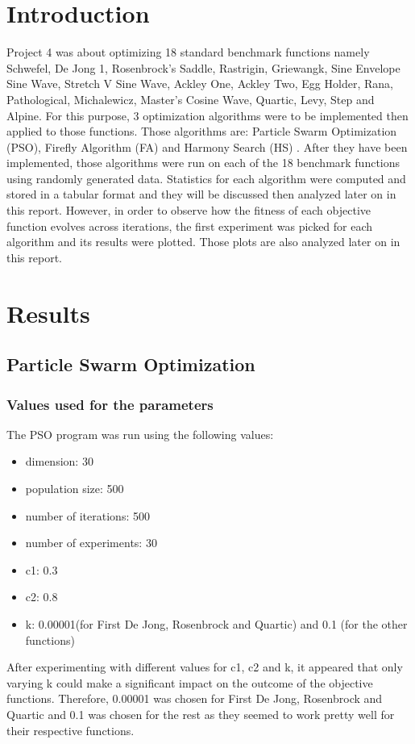\documentclass[12pt]{article}
\begin{document}
	\section{Introduction}
	Project 4 was about optimizing 18 standard benchmark functions namely Schwefel, De Jong 1, Rosenbrock's Saddle, Rastrigin, Griewangk, Sine Envelope Sine Wave, Stretch V Sine Wave, Ackley One, Ackley Two, Egg Holder, Rana, Pathological, Michalewicz, Master's Cosine Wave, Quartic, Levy, Step and Alpine. For this purpose, 3 optimization algorithms were to be implemented then applied to those functions. Those algorithms are: Particle Swarm Optimization (PSO), Firefly Algorithm (FA) and Harmony Search (HS) . After they have been implemented, those algorithms were run on each of the 18 benchmark functions using randomly generated data. Statistics for each algorithm were computed and stored in a tabular format and they will be discussed then analyzed later on in this report. However, in order to observe how the fitness of each objective function evolves across iterations, the first experiment was picked for each algorithm and its results were plotted. Those plots are also analyzed later on in this report.
	
		
	\section{Results}
	
		\subsection{ Particle Swarm Optimization}
		
			\subsubsection{Values used for the parameters}
				The PSO program was  run using  the following values:
				\begin{itemize}
					\item dimension: 30
					\item population size: 500
					\item number of iterations: 500
					\item number of experiments: 30
					\item c1: 0.3
					\item c2: 0.8
					\item k: 0.00001(for First De Jong, Rosenbrock and Quartic) and 0.1 (for the other functions) 
				\end{itemize}
			After experimenting with different values for c1, c2 and k, it appeared that only varying k could make a significant impact on the outcome of the objective functions. Therefore, 0.00001 was chosen for First De Jong, Rosenbrock and Quartic and 0.1 was chosen for the rest as they seemed to work pretty well for their respective functions.
		
\end{document}
